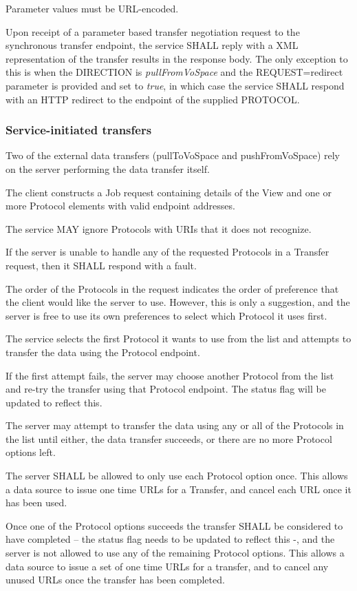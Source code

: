 \documentclass[11pt,a4paper]{ivoa}
\begin{document}
Parameter values must be URL-encoded.

Upon receipt of a parameter based transfer negotiation request to the synchronous transfer endpoint, the service SHALL reply with a XML representation of the transfer results in the response body.  The only exception to this is when the DIRECTION is \emph{pullFromVoSpace} and the REQUEST=redirect parameter is provided and set to \emph{true}, in which case the service SHALL respond with an HTTP redirect to the endpoint of the supplied PROTOCOL.

\subsubsection{Service-initiated transfers}
\label{subsubsec:service-initiated transfers}
Two of the external data transfers (pullToVoSpace and pushFromVoSpace) rely on the server performing the data transfer itself.

The client constructs a Job request containing details of the View and one or more Protocol elements with valid endpoint addresses.

The service MAY ignore Protocols with URIs that it does not recognize.

If the server is unable to handle any of the requested Protocols in a Transfer request, then it SHALL respond with a fault.

The order of the Protocols in the request indicates the order of preference that the client would like the server to use. However, this is only a suggestion, and the server is free to use its own preferences to select which Protocol it uses first.

The service selects the first Protocol it wants to use from the list and attempts to transfer the data using the Protocol endpoint.

If the first attempt fails, the server may choose another Protocol from the list and re-try the transfer using that Protocol endpoint. The status flag will be updated to reflect this.

The server may attempt to transfer the data using any or all of the Protocols in the list until either, the data transfer succeeds, or there are no more Protocol options left.

The server SHALL be allowed to only use each Protocol option once. This allows a data source to issue one time URLs for a Transfer, and cancel each URL once it has been used.

Once one of the Protocol options succeeds the transfer SHALL be considered to have completed -- the status flag needs to be updated to reflect this -, and the server is not allowed to use any of the remaining Protocol options. This allows a data source to issue a set of one time URLs for a transfer, and to cancel any unused URLs once the transfer has been completed.
\end{document}
